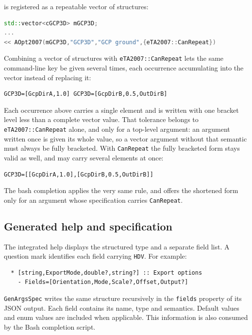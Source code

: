 is registered as a repeatable vector of structures:

\begin{lstlisting}[language=C++]
std::vector<cGCP3D> mGCP3D;
...
<< AOpt2007(mGCP3D,"GCP3D","GCP ground",{eTA2007::CanRepeat})
\end{lstlisting}

Combining a vector of structures with \texttt{eTA2007::CanRepeat} lets the same
command-line key be given several times, each occurrence accumulating into the
vector instead of replacing it:

\begin{verbatim}
GCP3D=[GcpDirA,1.0] GCP3D=[GcpDirB,0.5,OutDirB]
\end{verbatim}

Each occurrence above carries a single element and is written with one bracket level
less than a complete vector value.  That tolerance belongs to
\texttt{eTA2007::CanRepeat} alone, and only for a top-level argument: an argument
written once is given its whole value, so a vector argument without that semantic
must always be fully bracketed.  With \texttt{CanRepeat} the fully bracketed form
stays valid as well, and may carry several elements at once:

\begin{verbatim}
GCP3D=[[GcpDirA,1.0],[GcpDirB,0.5,OutDirB]]
\end{verbatim}

The bash completion applies the very same rule, and offers the shortened form only
for an argument whose specification carries \texttt{CanRepeat}.


\subsection{Generated help and specification}

The integrated help displays the structured type and a separate field list.  A
question mark identifies each field carrying \texttt{HDV}.  For example:

\begin{verbatim}
  * [string,ExportMode,double?,string?] :: Export options
    - Fields=[Orientation,Mode,Scale?,Offset,Output?]
\end{verbatim}

\texttt{GenArgsSpec} writes the same structure recursively in the \texttt{fields}
property of its JSON output.  Each field contains its name, type and semantics.
Default values and enum values are included when applicable.  This information is
also consumed by the Bash completion script.
